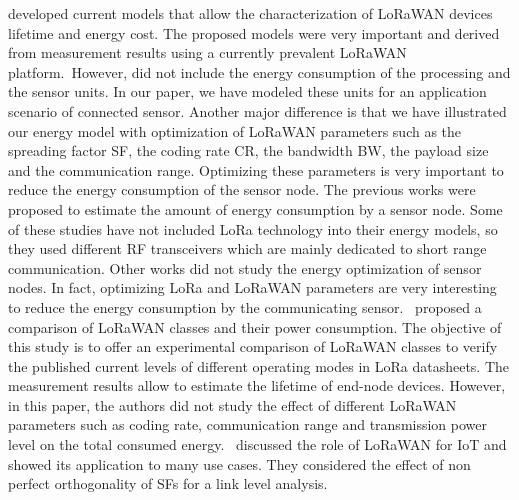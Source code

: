  \cite{casals_modeling_2017}   \citet{casals_modeling_2017} developed current models that allow the characterization of LoRaWAN devices lifetime and energy cost. The proposed models were very important and derived from measurement results using a currently prevalent LoRaWAN platform.~However, \citet{casals_modeling_2017} did not include the energy consumption of the processing and the sensor units. In our paper, we have modeled these units for an application scenario of connected sensor. Another major difference is that we have illustrated our energy model with optimization of LoRaWAN parameters such as the spreading factor SF, the coding rate CR, the bandwidth BW, the payload size and the communication range. Optimizing these parameters is very important to reduce the energy consumption of the sensor node. The previous works were proposed to estimate the amount of energy consumption by a sensor node. Some of these studies have not included LoRa technology into their energy models, so they used different RF transceivers which are mainly dedicated to short range communication. Other works did not study the energy optimization of sensor nodes. In fact, optimizing LoRa and LoRaWAN parameters are very interesting to reduce the energy consumption by the communicating sensor.~   \newline 
 \cite{cheong_comparison_2017}   \citet{cheong_comparison_2017} proposed a comparison of LoRaWAN classes and their power consumption. The objective of this study is to offer an experimental comparison of LoRaWAN classes to verify the published current levels of different operating modes in LoRa datasheets. The measurement results allow to estimate the lifetime of end-node devices. However, in this paper, the authors did not study the effect of different LoRaWAN parameters such as coding rate, communication range and transmission power level on the total consumed energy.~   \newline 
 \cite{feltrin_lorawan_2018}   \citet{feltrin_lorawan_2018} discussed the role of LoRaWAN for IoT and showed its application to many use cases. They considered the effect of non perfect orthogonality of SFs for a link level analysis.~   \newline 
